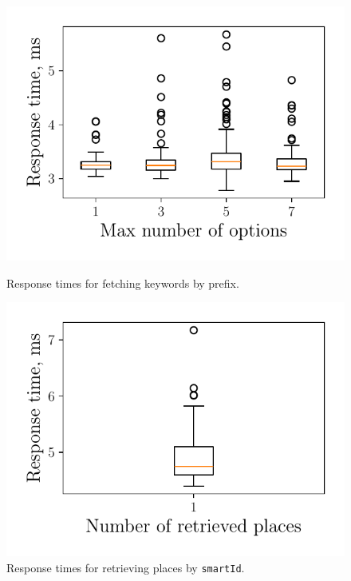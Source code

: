 \begin{figure}[!h]
  \begin{minipage}{0.48\textwidth}
    \centering
    \includegraphics[width=\linewidth]{img/testing/perf-advice-keywords.pdf}
    \caption{Response times for fetching keywords by prefix.}
    \label{fig:perf-advice-keywords}
  \end{minipage}
  \hfill
  \begin{minipage}{0.48\textwidth}
    \centering
    \includegraphics[width=\linewidth]{img/testing/perf-entity-places.pdf}
    \caption{Response times for retrieving places by \texttt{smartId}.}
    \label{fig:perf-entity-places}
  \end{minipage}
\end{figure}

